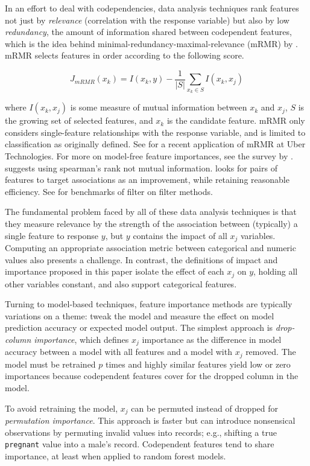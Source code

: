 \documentclass[11pt]{article}
\begin{document}
In an effort to deal with codependencies, data analysis techniques rank features not just by {\em relevance} (correlation with the response variable) but also by low {\em redundancy}, the amount of information shared between codependent features, which is the idea behind minimal-redundancy-maximal-relevance (mRMR) by \citep{mRMR}. mRMR selects features in order according to the following score.

\[
J_{mRMR}(x_k) = I(x_k, y) - \frac{1}{|S|} \sum_{x_k \in S} I(x_k, x_j)
\]

\noindent where $I(x_k, x_j)$ is some measure of mutual information between $x_k$ and $x_j$, $S$ is the growing set of selected features, and $x_k$ is the candidate feature. mRMR only considers single-feature relationships with the response variable, and is limited to classification as originally defined. See \citep{ubermRMR} for a recent application of mRMR at Uber Technologies.  For more on model-free feature importances, see the survey by \citep{survey}.  \citet{tsanas} suggests using spearman's rank not mutual information. \citet{meyer-microarray} looks for pairs of features to target associations as an improvement, while retaining reasonable efficiency. See \citet{filter-benchmark} for benchmarks of filter on filter methods.

The fundamental problem faced by all of these data analysis techniques is that they measure relevance by the strength of the association between (typically) a single feature to response $y$, but $y$ contains the impact of all $x_j$ variables. Computing an appropriate association metric between categorical and numeric values also presents a challenge.  In contrast, the definitions of impact and importance proposed in this paper isolate the effect of each $x_j$ on $y$, holding all other variables constant, and also support categorical features.
 
Turning to model-based techniques, feature importance methods are typically variations on a theme: tweak the model and measure the effect on model prediction accuracy or expected model output. The simplest approach is {\em drop-column importance}, which defines $x_j$ importance as the difference in model accuracy between a model with all features and a model with $x_j$ removed. The model must be retrained $p$ times and highly similar features yield low or zero importances because codependent features cover for the dropped column in the model.

To avoid retraining the model, $x_j$ can be permuted instead of dropped for {\em permutation importance}. This approach is faster but can introduce nonsensical observations by permuting invalid values into records; e.g., shifting a true {\tt\small pregnant} value into a male's record. Codependent features tend to share importance, at least when applied to random forest models.
\end{document}
